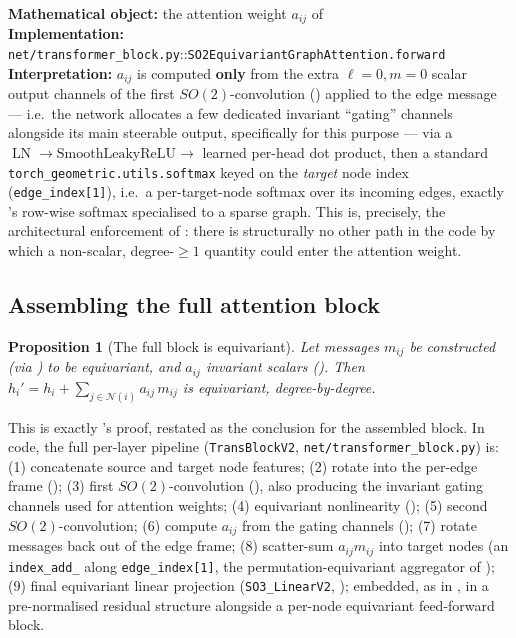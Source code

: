\documentclass[11pt,a4paper]{report}
\newtheorem{proposition}[proposition]{Proposition}
\theoremstyle{definition}
\theoremstyle{remark}
\DeclareMathOperator{\LN}{LN}
\newcommand{\file}[1]{\texttt{#1}}
\newcommand{\pyfunc}[1]{\texttt{#1}}
\begin{document}
\begin{codebox}
\textbf{Mathematical object:} the attention weight $a_{ij}$ of
 \\
\textbf{Implementation:} \file{net/transformer\_block.py}::\pyfunc{SO2EquivariantGraphAttention.forward} \\
\textbf{Interpretation:} $a_{ij}$ is computed \textbf{only} from the extra
$\ell=0,m=0$ scalar output channels of the first $SO(2)$-convolution
() applied to the edge message --- i.e.\ the network
allocates a few dedicated invariant ``gating'' channels alongside its main
steerable output, specifically for this purpose --- via a
$\LN\to\mathrm{SmoothLeakyReLU}\to$ learned per-head dot product, then a
standard \texttt{torch\_geometric.utils.softmax} keyed on the
\emph{target} node index (\texttt{edge\_index[1]}), i.e.\ a per-target-node
softmax over its incoming edges, exactly 's
row-wise softmax specialised to a sparse graph. This is, precisely, the
architectural enforcement of : there is
structurally no other path in the code by which a non-scalar, degree-$\ge1$
quantity could enter the attention weight.
\end{codebox}

\subsection{Assembling the full attention block}

\begin{proposition}[The full block is equivariant]
\label{prop:full-block-equivariant}
Let messages $m_{ij}$ be constructed (via )
to be equivariant, and $a_{ij}$ invariant scalars
(). Then
$h_i' = h_i + \sum_{j\in\mathcal N(i)}a_{ij}\,m_{ij}$ is equivariant,
degree-by-degree.
\end{proposition}

This is exactly 's proof, restated as
the conclusion for the assembled block. In code, the full per-layer
pipeline (\pyfunc{TransBlockV2}, \file{net/transformer\_block.py}) is: (1)
concatenate source and target node features; (2) rotate into the per-edge
frame (); (3) first $SO(2)$-convolution
(), also producing the invariant gating channels used
for attention weights; (4) equivariant nonlinearity
(); (5) second $SO(2)$-convolution; (6)
compute $a_{ij}$ from the gating channels ();
(7) rotate messages back out of the edge frame; (8) scatter-sum
$a_{ij}m_{ij}$ into target nodes (an \texttt{index\_add\_} along
\texttt{edge\_index[1]}, the permutation-equivariant aggregator of
); (9) final equivariant linear projection
(\pyfunc{SO3\_LinearV2}, ); embedded, as in
, in a pre-normalised residual structure
alongside a per-node equivariant feed-forward block.
\end{document}
